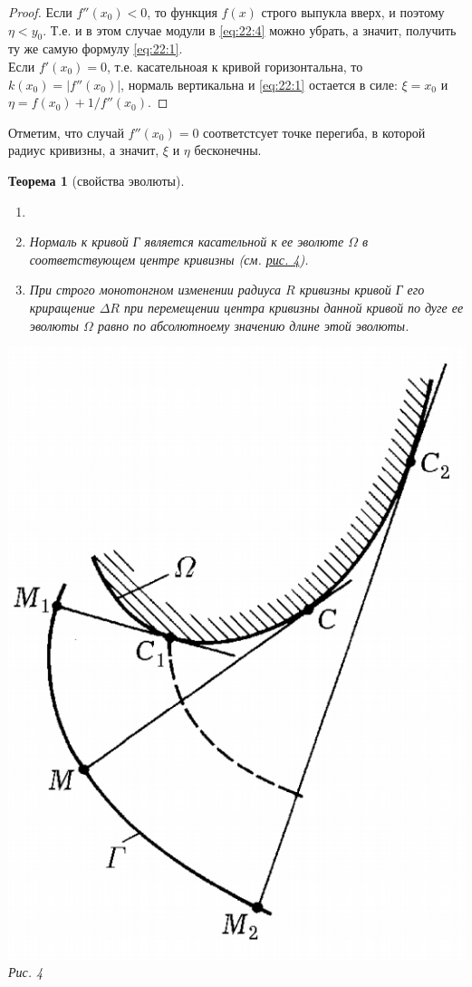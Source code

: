 \documentclass[12pt]{report}
\numberwithin{equation}{section}
\newtheorem{theorem}{Теорема}[section]
\begin{document}
\begin{proof}
Если $f''(x_0) < 0$, то функция $f(x)$ строго выпукла вверх, и поэтому $\eta < y_0$. Т.е. и в этом случае модули в \eqref{eq:22:4} можно убрать, а значит, получить ту же самую формулу \eqref{eq:22:1}.\\

Если $f'(x_0) = 0$, т.е. касательноая к кривой горизонтальна, то $k(x_0) = |f''(x_0)|$, нормаль вертикальна и \eqref{eq:22:1} остается в силе: $\xi = x_0$ и $\eta = f(x_0) + 1 / f''(x_0)$.
\end{proof}

Отметим, что случай $f''(x_0) = 0$ соответстсует точке перегиба, в которой радиус кривизны, а значит, $\xi$ и $\eta$ бесконечны.

\begin{theorem}[свойства эволюты] \label{th:22:3}
\begin{enumerate}
\item[]
\item[(1)] Нормаль к кривой Г является касательной к ее эволюте $\Omega$ в соответствующем центре кривизны (см. \hyperref[pic:22:2]{рис. 4}).
\item[(2)] При строго монотонгном изменении радиуса $R$ кривизны кривой Г его криращение $\Delta R$ при перемещении центра кривизны данной кривой по дуге ее эволюты $\Omega$ равно по абсолютноему значению длине этой эволюты.
\end{enumerate}
\begin{center}
\includegraphics[scale=0.3]{pic22_2.png} \label{pic:22:2}\\
Рис. 4
\end{center}
\end{theorem}
\end{document}

